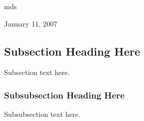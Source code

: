 \documentclass[12pt,journal,compsoc]{IEEEtran}
\begin{document}
\hfill mds
 
\hfill January 11, 2007

\subsection{Subsection Heading Here}
Subsection text here.


\subsubsection{Subsubsection Heading Here}
Subsubsection text here.


%
%



%
%
\end{document}
